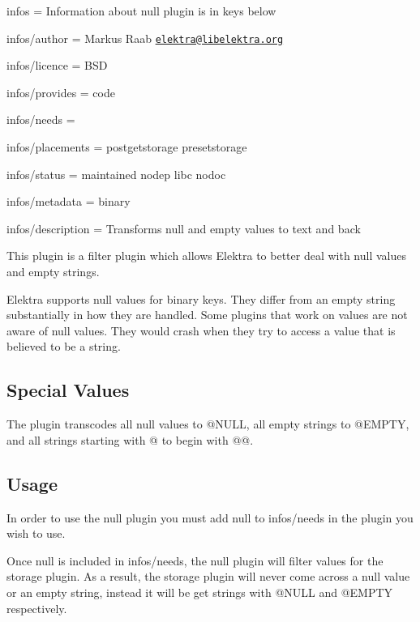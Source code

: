 
\begin{DoxyItemize}
\item infos = Information about null plugin is in keys below
\item infos/author = Markus Raab \href{mailto:elektra@libelektra.org}{\tt elektra@libelektra.\+org}
\item infos/licence = B\+SD
\item infos/provides = code
\item infos/needs =
\item infos/placements = postgetstorage presetstorage
\item infos/status = maintained nodep libc nodoc
\item infos/metadata = binary
\item infos/description = Transforms null and empty values to text and back
\end{DoxyItemize}

This plugin is a filter plugin which allows Elektra to better deal with null values and empty strings.

Elektra supports null values for binary keys. They differ from an empty string substantially in how they are handled. Some plugins that work on values are not aware of null values. They would crash when they try to access a value that is believed to be a string.

\subsection*{Special Values}

The plugin transcodes all null values to {\ttfamily @N\+U\+LL}, all empty strings to {\ttfamily @E\+M\+P\+TY}, and all strings starting with {\ttfamily @} to begin with {\ttfamily @@}.

\subsection*{Usage}

In order to use the {\ttfamily null} plugin you must add {\ttfamily null} to {\ttfamily infos/needs} in the plugin you wish to use.

Once {\ttfamily null} is included in {\ttfamily infos/needs}, the null plugin will filter values for the storage plugin. As a result, the storage plugin will never come across a null value or an empty string, instead it will be get strings with {\ttfamily @N\+U\+LL} and {\ttfamily @E\+M\+P\+TY} respectively. 